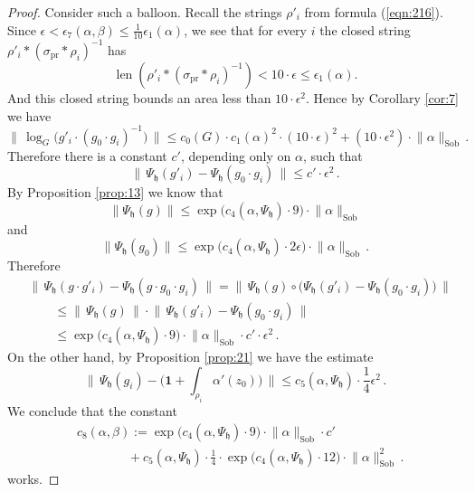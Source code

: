 \documentclass[10pt, a4paper]{amsart}
\theoremstyle{definition}
\numberwithin{equation}{section}
\newcommand{\opn}{\operatorname}
\newcommand{\mfrak}[1]{\mathfrak{#1}}
\newcommand{\mrm}[1]{\mathrm{#1}}
\newcommand{\smfrac}[2]{{\textstyle \frac{#1}{#2}}}
\newcommand{\bsym}[1]{\boldsymbol{#1}}
\newcommand{\norm}[1]{\lVert #1 \rVert}
\newcommand{\Norm}[1]{\bigl\lVert\, #1 \, \bigr\rVert}
\newcommand{\h}{\mfrak{h}}
\begin{document}
\begin{proof}
Consider such a balloon. 
Recall the strings $\rho'_i$ from formula (\ref{eqn:216}). 
Since 
$\epsilon < \epsilon_7(\alpha, \beta) \leq 
\smfrac{1}{10} \epsilon_1(\alpha)$, we see that for every $i$ 
the closed string $\rho'_i * (\sigma_{\mrm{pr}} * \rho_i)^{-1}$ has 
\[ \opn{len}(\rho'_i * (\sigma_{\mrm{pr}} * \rho_i)^{-1}) <
10 \cdot \epsilon \leq \epsilon_1(\alpha) . \]
And this closed string bounds an area less than 
$10 \cdot \epsilon^2$. Hence by Corollary \ref{cor:7} we have
\[ \Norm{ \log_G \bigl( g'_i \cdot (g_0 \cdot g_i)^{-1} \bigr) } \leq
c_0(G) \cdot c_1(\alpha)^2 \cdot (10 \cdot \epsilon)^2 +
(10 \cdot \epsilon^2) \cdot \norm{\alpha}_{\mrm{Sob}} \, . \]
Therefore there is a constant $c'$, depending only on $\alpha$, such that 
\begin{equation} \label{eqn:205}
\Norm{ \Psi_{\h}(g'_i) - \Psi_{\h}(g_0 \cdot g_i) } \leq c' \cdot 
\epsilon^2 \, .
\end{equation}
By Proposition \ref{prop:13} we know that
\begin{equation*} \label{eqn:206}
\norm{ \Psi_{\h}(g) } \leq \exp \bigl( c_4(\alpha, \Psi_{\h}) \cdot 9 \bigr)
\cdot \norm{\alpha}_{\mrm{Sob}}  
\end{equation*}
and
\[ \norm{ \Psi_{\h}(g_0) } \leq \exp \bigl( 
c_4(\alpha, \Psi_{\h}) \cdot 2 \epsilon \bigr)
\cdot \norm{\alpha}_{\mrm{Sob}}  \, . \]
Therefore
\begin{equation*} \label{eqn:207}
\begin{aligned}
& \Norm{ \Psi_{\h}(g \cdot g'_i) - \Psi_{\h}(g \cdot g_0 \cdot g_i) } = 
\Norm{ \Psi_{\h}(g) \circ \bigl( \Psi_{\h}(g'_i) - 
\Psi_{\h}(g_0 \cdot g_i) \bigr) } \\
& \qquad \leq 
\Norm{ \Psi_{\h}(g) } \cdot 
\Norm{ \Psi_{\h}(g'_i) - \Psi_{\h}(g_0 \cdot g_i) } \\
& \qquad \leq 
\exp \bigl( c_4(\alpha, \Psi_{\h}) \cdot 9 \bigr)
\cdot \norm{\alpha}_{\mrm{Sob}} \cdot 
 c' \cdot \epsilon^2 \, .
\end{aligned}
\end{equation*}
On the other hand, by Proposition \ref{prop:21} we have the estimate
\begin{equation*} \label{eqn:208}
\Norm{ \Psi_{\h}(g_i) - \bigl( \bsym{1} + 
\int_{\rho_i} \alpha'(z_0) \bigr) }
\leq c_5(\alpha, \Psi_{\h}) \cdot \smfrac{1}{4} \epsilon^2 \, .
\end{equation*}
We conclude that the constant 
\[ \begin{aligned}
& c_8(\alpha, \beta) := 
\exp \bigl( c_4(\alpha, \Psi_{\h}) \cdot 9 \bigr)
\cdot \norm{\alpha}_{\mrm{Sob}} \cdot  c' \\
& \qquad  \qquad +
c_5(\alpha, \Psi_{\h}) \cdot \smfrac{1}{4} \cdot 
\exp \bigl( c_4(\alpha, \Psi_{\h}) \cdot 12 \bigr)
\cdot \norm{\alpha}_{\mrm{Sob}}^2 \, . 
\end{aligned} \]
works.
\end{proof}
\end{document}
